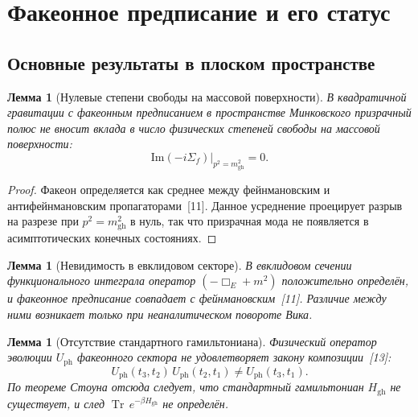 \documentclass[12pt,a4paper]{article}
\newcommand{\Tr}{\operatorname{Tr}}
\theoremstyle{plain}
\newtheorem{lemma}[theorem]{Лемма}
\theoremstyle{definition}
\begin{document}
\section{Факеонное предписание и его статус}\label{sec:fakeon}

\subsection{Основные результаты в плоском пространстве}

\begin{lemma}[Нулевые степени свободы на массовой поверхности]%
\label{lem:flat}
В квадратичной гравитации с факеонным предписанием в пространстве
Минковского призрачный полюс не вносит вклада в число физических
степеней свободы на массовой поверхности:
\begin{equation}\label{eq:Im_Sigma}
  \mathrm{Im}(-i\Sigma_f)\big|_{p^2 = m_{\mathrm{gh}}^2} = 0.
\end{equation}
\end{lemma}

\begin{proof}
Факеон определяется как среднее между фейнмановским и антифейнмановским
пропагаторами~[11]. Данное усреднение проецирует разрыв на разрезе
при $p^2 = m^2_{\mathrm{gh}}$ в нуль, так что призрачная мода не
появляется в асимптотических конечных состояниях.
\end{proof}

\begin{lemma}[Невидимость в евклидовом секторе]%
\label{lem:euclidean}
В евклидовом сечении функционального интеграла оператор
$(-\Box_E + m^2)$ положительно определён, и факеонное предписание
совпадает с фейнмановским~[11]. Различие между ними возникает
только при неаналитическом повороте Вика.
\end{lemma}

\begin{lemma}[Отсутствие стандартного гамильтониана]%
\label{lem:no_H}
Физический оператор эволюции $U_{\mathrm{ph}}$ факеонного сектора
не удовлетворяет закону композиции~[13]:
\begin{equation}
  U_{\mathrm{ph}}(t_3,t_2)\,U_{\mathrm{ph}}(t_2,t_1)
  \neq U_{\mathrm{ph}}(t_3,t_1).
\end{equation}
По теореме Стоуна отсюда следует, что стандартный гамильтониан
$H_{\mathrm{gh}}$ не существует, и след
$\Tr\,e^{-\beta H_{\mathrm{gh}}}$ не определён.
\end{lemma}
\end{document}
